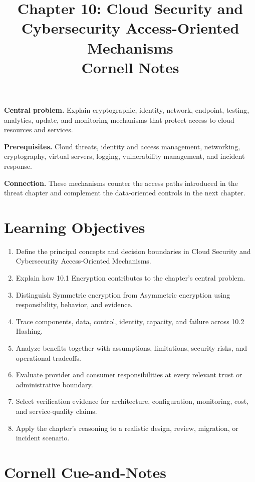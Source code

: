 \documentclass[11pt]{article}
\title{Chapter 10: Cloud Security and Cybersecurity Access-Oriented Mechanisms\\[2mm]\large Cornell Notes}
\author{}
\date{}
\begin{document}
\maketitle
\thispagestyle{fancy}
\vspace{-1.5em}
\begin{orientationbox}
\textbf{Central problem.} Explain cryptographic, identity, network, endpoint, testing, analytics, update, and monitoring mechanisms that protect access to cloud resources and services.\par\smallskip
\textbf{Prerequisites.} Cloud threats, identity and access management, networking, cryptography, virtual servers, logging, vulnerability management, and incident response.\par\smallskip
\textbf{Connection.} These mechanisms counter the access paths introduced in the threat chapter and complement the data-oriented controls in the next chapter.
\end{orientationbox}
\section{Learning Objectives}
\begin{enumerate}
\item Define the principal concepts and decision boundaries in Cloud Security and Cybersecurity Access-Oriented Mechanisms.
\item Explain how 10.1 Encryption contributes to the chapter's central problem.
\item Distinguish Symmetric encryption from Asymmetric encryption using responsibility, behavior, and evidence.
\item Trace components, data, control, identity, capacity, and failure across 10.2 Hashing.
\item Analyze benefits together with assumptions, limitations, security risks, and operational tradeoffs.
\item Evaluate provider and consumer responsibilities at every relevant trust or administrative boundary.
\item Select verification evidence for architecture, configuration, monitoring, cost, and service-quality claims.
\item Apply the chapter's reasoning to a realistic design, review, migration, or incident scenario.
\end{enumerate}
\section{Cornell Cue-and-Notes}
\end{document}
